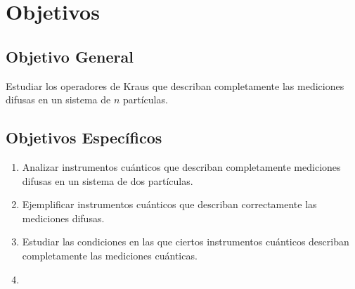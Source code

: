 
\chapter*{Objetivos} 

\section*{Objetivo General}

Estudiar los operadores de Kraus que describan completamente las mediciones difusas en un sistema de  $n$ partículas. 


\section*{Objetivos Específicos}
\begin{enumerate}
	

	
\item 	Analizar instrumentos cuánticos que describan completamente mediciones difusas en un sistema de dos partículas.



\item Ejemplificar instrumentos cuánticos que describan correctamente las mediciones difusas.


\item Estudiar las condiciones en las que ciertos instrumentos cuánticos describan completamente las mediciones cuánticas.

\item 
\end{enumerate}
